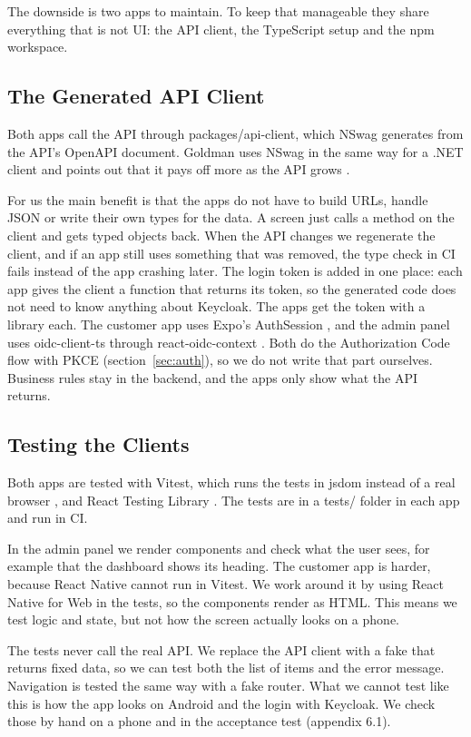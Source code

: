 \documentclass[a4paper,11pt]{article}
\begin{document}
The downside is two apps to maintain. To keep that manageable they share everything that is not UI: the API client, the TypeScript setup and the npm workspace.

\subsection{The Generated API Client}
Both apps call the API through packages/api-client, which NSwag generates from the API's OpenAPI document. Goldman uses NSwag in the same way for a .NET client and points out that it pays off more as the API grows \cite[sec.~8.3, p.~255]{goldman-maui-in-action}.

For us the main benefit is that the apps do not have to build URLs, handle JSON or write their own types for the data. A screen just calls a method on the client and gets typed objects back. When the API changes we regenerate the client, and if an app still uses something that was removed, the type check in CI fails instead of the app crashing later. The login token is added in one place: each app gives the client a function that returns its token, so the generated code does not need to know anything about Keycloak. The apps get the token with a library each. The customer app uses Expo's AuthSession \cite{expo-auth-session}, and the admin panel uses oidc-client-ts \cite{authts-oidc-client-ts} through react-oidc-context \cite{authts-react-oidc-context}. Both do the Authorization Code flow with PKCE (section~\ref{sec:auth}), so we do not write that part ourselves. Business rules stay in the backend, and the apps only show what the API returns.

\subsection{Testing the Clients}
Both apps are tested with Vitest, which runs the tests in jsdom instead of a real browser \cite{vitest-test-environment}, and React Testing Library \cite{testing-library-react-intro}. The tests are in a tests/ folder in each app and run in CI.

In the admin panel we render components and check what the user sees, for example that the dashboard shows its heading. The customer app is harder, because React Native cannot run in Vitest. We work around it by using React Native for Web in the tests, so the components render as HTML. This means we test logic and state, but not how the screen actually looks on a phone.

The tests never call the real API. We replace the API client with a fake that returns fixed data, so we can test both the list of items and the error message. Navigation is tested the same way with a fake router. What we cannot test like this is how the app looks on Android and the login with Keycloak. We check those by hand on a phone and in the acceptance test (appendix 6.1).
\end{document}
